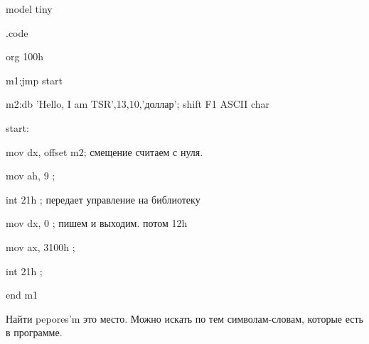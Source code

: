 model tiny

.code

org 100h

m1:jmp start

m2:db 'Hello, I am TSR',13,10,'доллар'; shift F1 ASCII char

start: 

mov dx, offset m2; смещение считаем с нуля. 

mov ah, 9        ;

int 21h          ; передает управление на библиотеку

mov dx, 0        ; пишем и выходим. потом 12h

mov ax, 3100h    ;

int 21h          ;

end m1

Найти pepores'm это место. Можно искать по тем символам-словам, которые есть в программе. 